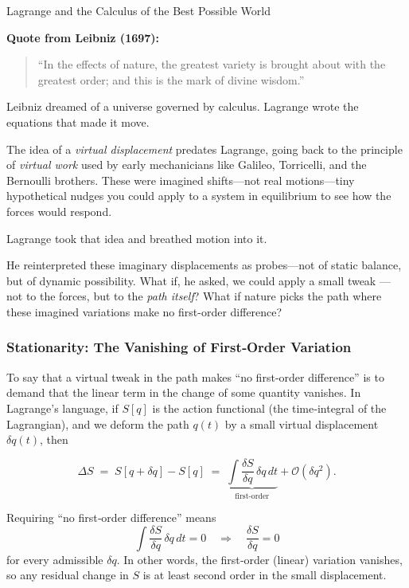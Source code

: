 \begin{HistoricalSidebar}{Lagrange and the Calculus of the Best Possible World}
        \medskip
    
        \textbf{Quote from Leibniz (1697):}
        \begin{quote}
        “In the effects of nature, the greatest variety is brought about with the greatest order; and this is the mark of divine wisdom.”
        \end{quote}
    
        Leibniz dreamed of a universe governed by calculus. Lagrange wrote the equations that made it move.
    
\end{HistoricalSidebar}

\medskip

The idea of a \textit{virtual displacement} predates Lagrange, going back to the principle of \textit{virtual work} used by early mechanicians like Galileo, Torricelli, and the Bernoulli brothers. These were imagined shifts—not real motions—tiny hypothetical nudges you could apply to a system in equilibrium to see how the forces would respond.

Lagrange took that idea and breathed motion into it.

He reinterpreted these imaginary displacements as probes—not of static balance, but of dynamic possibility. What if, he asked, we could apply a small tweak — not to the forces, but to the \textit{path itself}? What if nature picks the path where these imagined variations make no first-order difference?

\subsubsection{Stationarity: The Vanishing of First‐Order Variation}

To say that a virtual tweak in the path makes “no first‐order difference” is to demand that the linear term in the change of some quantity vanishes.  In Lagrange’s language, if \(S[q]\) is the action functional (the time‐integral of the Lagrangian), and we deform the path \(q(t)\) by a small virtual displacement \(\delta q(t)\), then

\[
\Delta S \;=\; S[q + \delta q] - S[q]
\;=\; \underbrace{\int \frac{\delta S}{\delta q}\,\delta q\,dt}_{\text{first‐order}} + \mathcal{O}(\delta q^2).
\]

Requiring “no first‐order difference” means
\[
\int \frac{\delta S}{\delta q}\,\delta q\,dt = 0
\quad\Longrightarrow\quad
\frac{\delta S}{\delta q} = 0
\]
for every admissible \(\delta q\).  In other words, the first‐order (linear) variation vanishes, so any residual change in \(S\) is at least second order in the small displacement.


